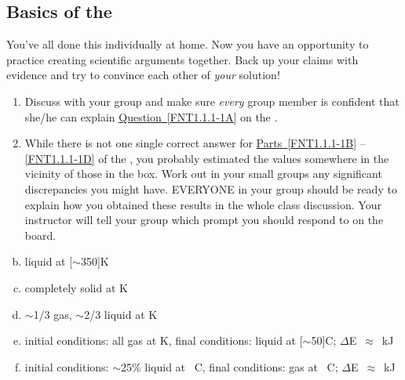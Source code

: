 \subsection{Basics of the \ThreePhaseModel{}}

\begin{FNTenv}
	
\end{FNTenv}

\noindent
You've all done this \FNT{} individually at home. Now you have an opportunity to practice creating scientific arguments together. Back up your claims with evidence and try to convince each other of \emph{your} solution!

\begin{enumerate}
	\item Discuss with your group and make sure \emph{every} group member is confident that she/he can explain \hyperref[FNT1.1.1-1A]{Question~\ref*{FNT1.1.1-1A}} on the \FNT{}.
	
	\item While there is not one single correct answer for \hyperref[\FNT1.1.1-1B]{Parts~\ref*{FNT1.1.1-1B}} -- \hyperref[FNT1.1.1-1D]{\ref*{FNT1.1.1-1D}} of the \FNT{}, you probably estimated the values somewhere in the vicinity of those in the box. Work out in your small groups any significant discrepancies you might have. EVERYONE in your group should be ready to explain how you obtained these results in the whole class discussion. Your instructor will tell your group which prompt you should respond to on the board.
\end{enumerate}

\begin{ans}
	\begin{enumerate}[(a)]
	  \setcounter{enumi}{1}
		\item liquid at \unit[$\sim$350]{K}
		\item completely solid at \unit[273]{K}
		\item $\sim$1/3 gas, $\sim$2/3 liquid at \unit[373]{K}
		\item initial conditions: all gas at \unit[373]{K}, final conditions: liquid at \unit[$\sim$50]{\textdegree C}; $\Delta$E~$\approx$~\unit[2470]{kJ}
		\item initial conditions: $\sim$25\% liquid at \unit[0]{\textdegree C}, final conditions: gas at \unit[100]{\textdegree C}; $\Delta$E~$\approx$~\unit[3000]{kJ}
	\end{enumerate}
\end{ans}


